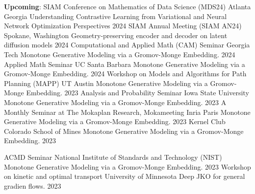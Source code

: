 

\begingroup
\allowdisplaybreaks
\begin{cvtalks}

\cvtalk
    {\textbf{Upcoming}: SIAM Conference on Mathematics of Data Science (MDS24)} %
    {Atlanta Georgia}
    {Understanding Contrastive Learning from Variational and Neural Network Optimization Perspectives} %
    {2024} %
\cvtalk
    {SIAM Annual Meeting (SIAM AN24)} %
    {Spokane, Washington}
    {Geometry-preserving encoder and decoder on latent diffusion models} %
    {2024} %
\cvtalk
    {Computational and Applied Math (CAM) Seminar} %
    {Georgia Tech}
    {Monotone Generative Modeling via a Gromov-Monge Embedding.} %
    {2024} %
\cvtalk
    {Applied Math Seminar} %
    {UC Santa Barbara}
    {Monotone Generative Modeling via a Gromov-Monge Embedding.} %
    {2024} %
\cvtalk
    {Workshop on Models and Algorithms for Path Planning (MAPP)} %
    {UT Austin}
    {Monotone Generative Modeling via a Gromov-Monge Embedding.} %
    {2023} %
\cvtalk
    {Analysis and Probability Seminar}
    {Iowa State University}
    {Monotone Generative Modeling via a Gromov-Monge Embedding.}
    {2023}
\cvtalk
    {A Monthly Seminar at The Mokaplan Research, Mokameeting} %
    {Inria Paris}
    {Monotone Generative Modeling via a Gromov-Monge Embedding.} %
    {2023} %
\cvtalk
    {Kernel Club} %
    {Colorado School of Mines}
    {Monotone Generative Modeling via a Gromov-Monge Embedding.} %
    {2023} %

\cvtalk
    {ACMD Seminar} %
    {National Institute of Standards and Technology (NIST)}
    {Monotone Generative Modeling via a Gromov-Monge Embedding.} %
    {2023} %
\cvtalk
    {Workshop on kinetic and optimal transport} %
    {University of Minnesota}
    {Deep JKO for general gradien flows.} %
    {2023} %
  

\end{cvtalks}
